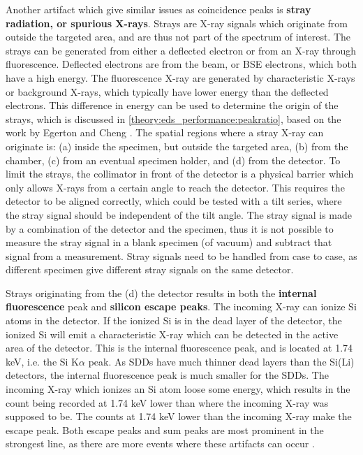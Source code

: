 Another artifact which give similar issues as coincidence peaks is \textbf{stray radiation, or spurious X-rays}.
Strays are X-ray signals which originate from outside the targeted area, and are thus not part of the spectrum of interest.
The strays can be generated from either a deflected electron or from an X-ray through fluorescence.
Deflected electrons are from the beam, or BSE electrons, which both have a high energy.
The fluorescence X-ray are generated by characteristic X-rays or background X-rays, which typically have lower energy than the deflected electrons.
This difference in energy can be used to determine the origin of the strays, which is discussed in \cref{theory:eds_performance:peakratio}, based on the work by Egerton and Cheng \cite{egerton_nio_characterization_1994}.
The spatial regions where a stray X-ray can originate is: (a) inside the specimen, but outside the targeted area, (b) from the chamber, (c) from an eventual specimen holder, and (d) from the detector.
To limit the strays, the collimator in front of the detector is a physical barrier which only allows X-rays from a certain angle to reach the detector.
This requires the detector to be aligned correctly, which could be tested with a tilt series, where the stray signal should be independent of the tilt angle.
The stray signal is made by a combination of the detector and the specimen, thus it is not possible to measure the stray signal in a blank specimen (of vacuum) and subtract that signal from a measurement.
Stray signals need to be handled from case to case, as different specimen give different stray signals on the same detector.


Strays originating from the (d) the detector results in both the \textbf{internal fluorescence} peak and \textbf{silicon escape peaks}.
The incoming X-ray can ionize Si atoms in the detector.
If the ionized Si is in the dead layer of the detector, the ionized Si will emit a characteristic X-ray which can be detected in the active area of the detector.
This is the internal fluorescence peak, and is located at 1.74 keV, i.e. the Si K$\alpha$ peak.
As SDDs have much thinner dead layers than the Si(Li) detectors, the internal fluorescence peak is much smaller for the SDDs.
The incoming X-ray which ionizes an Si atom loose some energy, which results in the count being recorded at 1.74 keV lower than where the incoming X-ray was supposed to be.
The counts at 1.74 keV lower than the incoming X-ray make the escape peak.
Both escape peaks and sum peaks are most prominent in the strongest line, as there are more events where these artifacts can occur \cite{astm_e1508_eds_quantification}.


